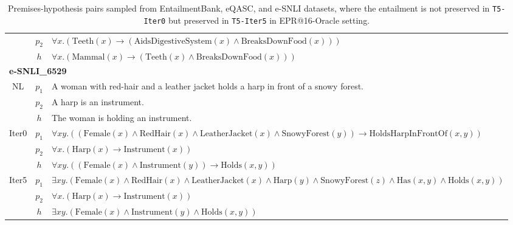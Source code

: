 \begin{table*}[ht]
\begin{tabular}{c|c|l}
           & $p_2$ & $\forall x.(\text{Teeth}(x) \rightarrow (\text{AidsDigestiveSystem}(x) \land \text{BreaksDownFood}(x)))$ \\
           & $h$ & $\forall x.(\text{Mammal}(x) \rightarrow (\text{Teeth}(x) \land \text{BreaksDownFood}(x)))$ \\
    \hline
    \multicolumn{3}{l}{\textbf{e-SNLI\_6529}} \\
    \hline
    NL & $p_1$ & A woman with red-hair and a leather jacket holds a harp in front of a snowy forest. \\
           & $p_2$ & A harp is an instrument. \\
           & $h$ & The woman is holding an instrument. \\
    \hline
    Iter0 & $p_1$ & $\forall x y.((\text{Female}(x) \land \text{RedHair}(x) \land \text{LeatherJacket}(x) \land \text{SnowyForest}(y)) \rightarrow \text{HoldsHarpInFrontOf}(x,y))$ \\
           & $p_2$ & $\forall x.(\text{Harp}(x) \rightarrow \text{Instrument}(x))$ \\
           & $h$ & $\forall x y.((\text{Female}(x) \land \text{Instrument}(y)) \rightarrow \text{Holds}(x,y))$ \\
    \hline
    Iter5 & $p_1$ & $\exists x y.(\text{Female}(x) \land \text{RedHair}(x) \land \text{LeatherJacket}(x) \land \text{Harp}(y) \land \text{SnowyForest}(z) \land \text{Has}(x,y) \land \text{Holds}(x,y))$ \\
           & $p_2$ & $\forall x.(\text{Harp}(x) \rightarrow \text{Instrument}(x))$ \\
           & $h$ & $\exists x y.(\text{Female}(x) \land \text{Instrument}(y) \land \text{Holds}(x,y))$ \\
    \hline
    \end{tabular}
    \caption{Premises-hypothesis pairs sampled from EntailmentBank, eQASC, and e-SNLI datasets, where the entailment is not preserved in \texttt{T5-Iter0} but preserved in \texttt{T5-Iter5} in EPR@16-Oracle setting.}
    \label{tab:examples}
\end{table*}
